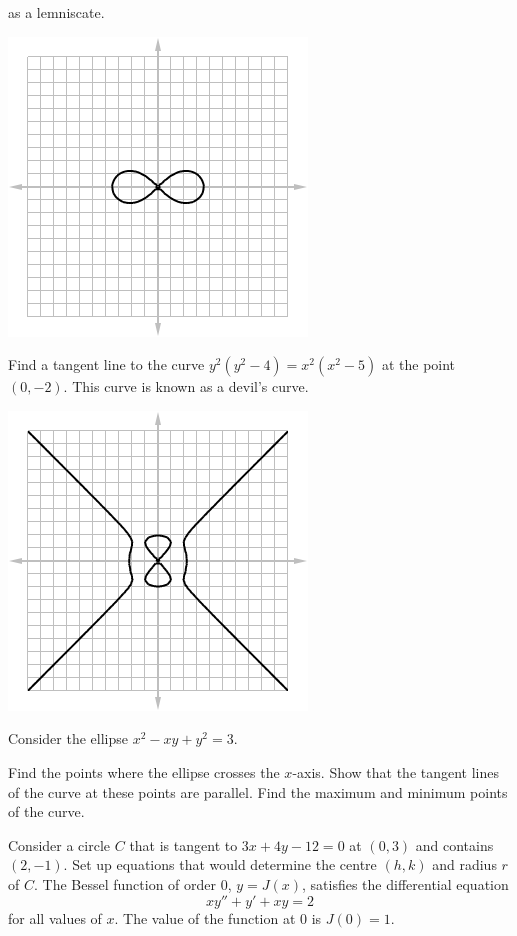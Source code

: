 \begin{questions}
\begin{multicols}{2}
            as a lemniscate.
            \begin{center}
              \includegraphics[width=0.6\linewidth]{lemniscate}
            \end{center}
  \end{multicols}
  \begin{multicols}{2}
  \questioM Find a tangent line to the curve $ y^2(y^2 - 4) = x^2(x^2 - 5) $ at the point $ (0, -2) $. This curve is known
            as a devil's curve.
            \begin{center}
              \includegraphics[width=0.6\linewidth]{devilcurve}
            \end{center}
  \end{multicols}
  \question Consider the ellipse $ x^2 - xy + y^2 = 3 $.
    \begin{parts}
      \parA Find the points where the ellipse crosses the $ x$-axis.
      \parM Show that the tangent lines of the curve at these points are parallel.
      \parE Find the maximum and minimum points of the curve.
    \end{parts}
  \questioE Consider a circle $ C $ that is tangent to $ 3x + 4y - 12 = 0 $ at $ (0, 3) $ and contains $ (2, -1) $. Set
            up equations that would determine the centre $ (h,k) $ and radius $ r $ of $ C $.
  \questioS The Bessel function of order 0, $ y = J(x) $, satisfies the differential equation
            \begin{displaymath}
              xy'' + y' + xy = 2
            \end{displaymath}
            for all values of $ x $. The value of the function at 0 is $ J(0) = 1 $.
    \begin{parts}

\end{parts}
\end{questions}
